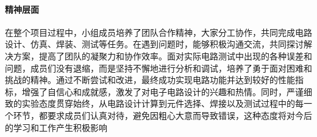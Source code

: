 \documentclass[./测控三级项目.tex]{subfiles} %
\begin{document}
		\paragraph{\qquad 精神层面}
		在整个项目过程中，小组成员培养了团队合作精神，大家分工协作，共同完成电路设计、仿真、焊装、测试等任务。在遇到问题时，能够积极沟通交流，共同探讨解决方案，提高了团队的凝聚力和协作效率。面对实际电路测试中出现的各种误差和问题，成员们没有退缩，而是坚持不懈地进行分析和调试，培养了勇于面对困难和挑战的精神。通过不断尝试和改进，最终成功实现电路功能并达到较好的性能指标，增强了自信心和成就感，激发了对电子电路设计的兴趣和热情。同时，严谨细致的实验态度贯穿始终，从电路设计计算到元件选择、焊接以及测试过程中的每一个环节，都要求成员们认真对待，避免因粗心大意而导致错误，这种态度将对今后的学习和工作产生积极影响
	
	
\end{document}
